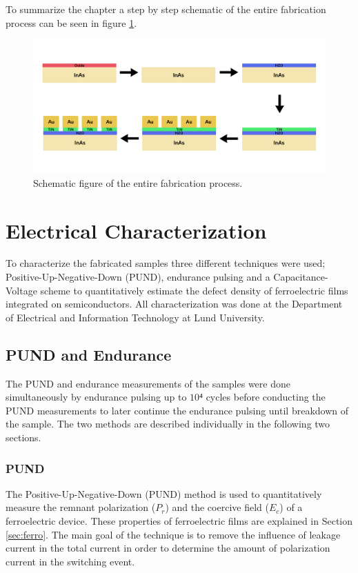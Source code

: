 \documentclass[11pt,twoside]{eitExjobb}
\begin{document}
To summarize the chapter a step by step schematic of the entire fabrication
process can be seen in figure \ref{fig:fab_done}.

\begin{figure}[htbp]
    \centering
    \includegraphics[width=.80\linewidth]{fig/fabproc/fab_done.png}
    \caption{Schematic figure of the entire fabrication process.}\label{fig:fab_done}
\end{figure}

\chapter{Electrical Characterization}\label{ch:char}

To characterize the fabricated samples three different techniques were used;
Positive-Up-Negative-Down (PUND), endurance pulsing and a Capacitance-Voltage scheme to
quantitatively estimate the defect density of ferroelectric films integrated on
semiconductors. \cite{persson2020method} All characterization was done at the
Department of Electrical and Information Technology at Lund University.

\section{PUND and Endurance}\label{sec:PandE}
The PUND and endurance measurements of the samples were done simultaneously by
endurance pulsing up to $10⁴$ cycles before conducting the PUND measurements to
later continue the endurance pulsing until breakdown of the sample. The two
methods are described individually in the following two sections.

\subsection{PUND}\label{sec:PUND}
The Positive-Up-Negative-Down (PUND) method is used to quantitatively measure
the remnant polarization ($P_r$) and the coercive field ($E_c$) of a
ferroelectric device. These properties of ferroelectric films are explained in
Section \ref{sec:ferro}. The main goal of the technique is to remove the
influence of leakage current in the total current in order to determine the
amount of polarization current in the switching event.
\end{document}
